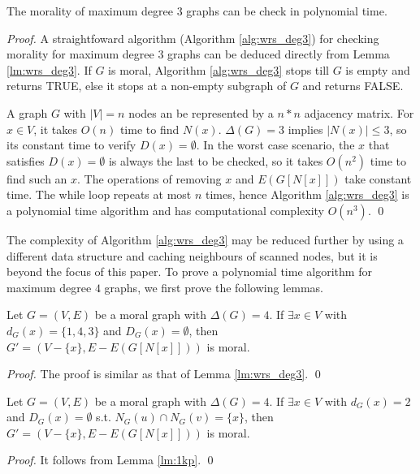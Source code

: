 \begin{theorem}
\label{thm:wrs_deg3}
The morality of maximum degree $3$ graphs can be check in polynomial time. 
\end{theorem}
\begin{proof}
A straightfoward algorithm (Algorithm \ref{alg:wrs_deg3}) for checking morality for maximum degree $3$ graphs can be deduced directly from Lemma \ref{lm:wrs_deg3}. If $G$ is moral, Algorithm \ref{alg:wrs_deg3} stops till $G$ is empty and returns TRUE, else it stops at a non-empty subgraph of $G$ and returns FALSE. 

A graph $G$ with $|V|=n$ nodes an be represented by a $n*n$ adjacency matrix. For $x \in V$, it takes $O(n)$ time to find $N(x)$. $\Delta(G)=3$ implies $|N(x)|\le 3$, so its constant time to verify $D(x)=\emptyset$. In the worst case scenario, the $x$ that satisfies $D(x)=\emptyset$ is always the last to be checked, so it takes $O(n^2)$ time to find such an $x$. The operations of removing $x$ and $E(G[N[x]])$ take constant time. The while loop repeats at most $n$ times, hence Algorithm \ref{alg:wrs_deg3} is a polynomial time algorithm and has computational complexity $O(n^3)$. \qed
\end{proof}
The complexity of Algorithm \ref{alg:wrs_deg3} may be reduced further by using a different data structure and caching neighbours of scanned nodes, but it is beyond the focus of this paper. To prove a polynomial time algorithm for maximum degree $4$ graphs, we first prove the following lemmas. 

\begin{lemma}
\label{lm:deg1_4_3}
Let $G=(V,E)$ be a moral graph with $\Delta(G)=4$. If $\exists x \in V$ with $d_G(x)=\{1,4,3\}$ and $D_G(x)=\emptyset$, then $G'=(V-\{x\},E-E(G[N[x]]))$ is moral. 
\end{lemma}
\begin{proof}
The proof is similar as that of Lemma \ref{lm:wrs_deg3}. \qed
\end{proof}

\begin{lemma}
\label{lm:1k3}
Let $G=(V,E)$ be a moral graph with $\Delta(G)=4$. If $\exists x \in V$ with $d_G(x)=2$ and $D_G(x)=\emptyset$ s.t. $N_G(u)\cap N_G(v)=\{x\}$, then $G'=(V-\{x\},E-E(G[N[x]]))$ is moral.
\end{lemma}
\begin{proof}
It follows from Lemma \ref{lm:1kp}. \qed
\end{proof}

